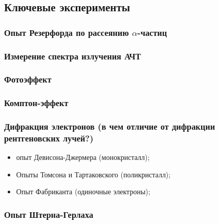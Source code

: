 \subsection{Ключевые эксперименты}

\subsubsection{Опыт Резерфорда по рассеянию $\alpha$-частиц}


\subsubsection{Измерение спектра излучения АЧТ}


\subsubsection{Фотоэффект}


\subsubsection{Комптон-эффект}


\subsubsection{Дифракция электронов (в чем отличие от дифракции рентгеновских лучей?)}
\begin{itemize}
	\item опыт Девисона-Джермера (монокристалл);
	\item Опыты Томсона  и Тартаковского (поликристалл);
	\item Опыт Фабриканта (одиночные электроны);
\end{itemize}


\subsubsection{Опыт Штерна-Герлаха}

